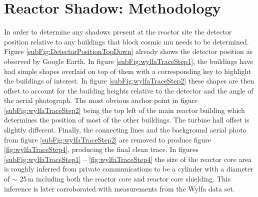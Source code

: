 \section{Reactor Shadow: Methodology} \label{sec:ReactorShadowMethodology}
In order to determine any shadows present at the reactor site the detector position relative to any buildings that block cosmic mu needs to be determined. Figure \ref{subFig:DetectorPositionTopDown} already shows the detector position as observed by Google Earth. In figure \ref{subFig:wylfaTraceStep1}, the buildings have had simple shapes overlaid on top of them with a corresponding key to highlight the buildings of interest. In figure \ref{subFig:wylfaTraceStep2} these shapes are then offset to account for the building heights relative to the detector and the angle of the aerial photograph. The most obvious anchor point in figure \ref{subFig:wylfaTraceStep2} being the top left of the main reactor building which determines the position of most of the other buildings. The turbine hall offset is slightly different. Finally, the connecting lines and the background aerial photo from figure \ref{subFig:wylfaTraceStep2} are removed to produce figure \ref{fig:wylfaTraceStep4}, producing the final clean trace. In figures \ref{subFig:wylfaTraceStep1}  -- \ref{fig:wylfaTraceStep4} the size of the reactor core area is roughly inferred from private communications to be a cylinder with a diameter of $\sim$ 25\,m including both the reactor core and reactor core shielding. This inference is later corroborated with measurements from the Wylfa data set. 


